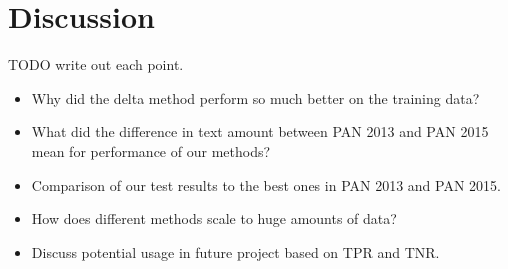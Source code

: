 \section{Discussion}
TODO write out each point.

\begin{itemize}
    \item Why did the delta method perform so much better on the training data?
    \item What did the difference in text amount between PAN 2013 and PAN 2015
        mean for performance of our methods?
    \item Comparison of our test results to the best ones in PAN 2013 and PAN
        2015.
    \item How does different methods scale to huge amounts of data?
    \item Discuss potential usage in future project based on TPR and TNR.
\end{itemize}
